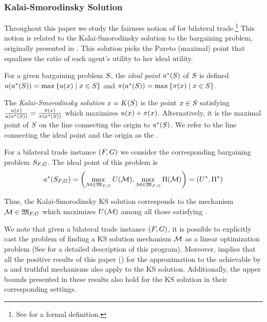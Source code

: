 {\subsubsection{Kalai-Smorodinsky Solution}

\label{subsec:ks-solution}

Throughout this paper we study the fairness notion of {\ksfairness} for bilateral trade.\footnote{See  for a formal definition.} This notion is related to the Kalai-Smorodinsky solution to the bargaining problem, originally presented in \citep{KS-75}.
This solution picks the Pareto (maximal) point that equalizes the ratio of each agent's utility to her ideal utility.



\begin{definition}
\label{def:ks-solution}
    For a given bargaining problem $S$, the \emph{ideal point} $a^*(S)$ of $S$ is defined $u(a^*(S))=\max\left\{u(x)\mid x\in S\right\}$ and $\pi(a^*(S))=\max\left\{\pi(x)\mid x\in S\right\}$.
    
    The \emph{Kalai-Smorodinsky solution} $x=K(S)$ is the point $x\in S$ satisfying $\frac{u(x)}{u(a^*(S))}=\frac{\pi(x)}{\pi(a^*(S))}$ which maximizes $u(x)+\pi(x)$. Alternatively, it is the maximal point of $S$ on the line connecting the origin to $a^*(S)$. {We refer to the line connecting the ideal point and the origin as the \emph{\ksline}}.
\end{definition}


For a bilateral trade instance $(F,G)$ we consider the corresponding bargaining problem $S_{F,G}$. The ideal point of this problem is
\begin{align*}
a^*(S_{F,G})= \left(\max_{\mathcal{M}\in\mathfrak{M}_{F,G}}U(\mathcal{M}),\max_{\mathcal{M}\in\mathfrak{M}_{F,G}}\Pi(\mathcal{M})\right)   =  (U^*, \Pi^*)
\end{align*}

Thus, the Kalai-Smorodinsky KS solution corresponds to the mechanism $\mathcal{M}\in \mathfrak{M}_{F,G}$ {which maximizes $U(\mathcal{M})$ among all those satisfying} {\ksfairness}.


We note that given a bilateral trade instance $(F,G)$, it is possible to explicitly cast the problem of finding a KS solution mechanism $\mathcal{M}$ as a linear optimization problem  (See  for a detailed description of this program). Moreover,  implies that all the positive results of this paper () for the approximation to the {\SecondBest} achievable by a {\ksfair} and truthful mechanisms also apply to the KS solution. Additionally, the upper bounds presented in these results also hold for the KS solution in their corresponding settings.



}
